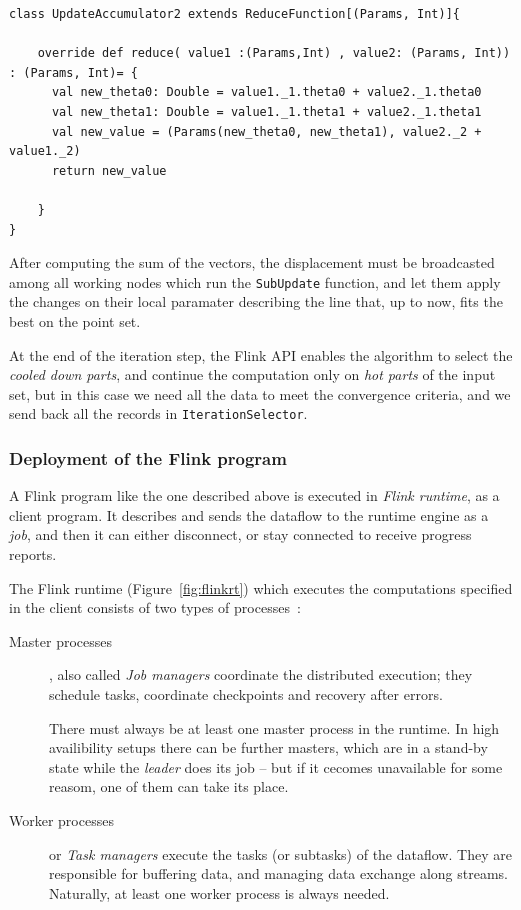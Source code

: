 {\small
\begin{verbatim}
class UpdateAccumulator2 extends ReduceFunction[(Params, Int)]{
   
    override def reduce( value1 :(Params,Int) , value2: (Params, Int)) : (Params, Int)= {
      val new_theta0: Double = value1._1.theta0 + value2._1.theta0
      val new_theta1: Double = value1._1.theta1 + value2._1.theta1
      val new_value = (Params(new_theta0, new_theta1), value2._2 + value1._2)
      return new_value

    }
}
\end{verbatim}
}

After computing the sum of the vectors, the displacement must be broadcasted among all working nodes which run the \verb:SubUpdate: function, and let them apply the changes on their local paramater describing the line that, up to now, fits the best on the point set.

At the end of the iteration step, the Flink API enables the algorithm to select the \textit{cooled down parts}, and continue the computation only on \textit{hot parts} of the input set, but in this case we need all the data to meet the convergence criteria, and we send back all the records in 
\verb|IterationSelector|. 

\subsubsection{Deployment of the Flink program}   
A Flink program like the one described above is executed in \textit{Flink runtime}, as a client program. It describes and sends the dataflow to the runtime engine as a \textit{job}, and then it can either disconnect, or stay connected to receive progress reports.

The Flink runtime (Figure~\ref{fig:flinkrt}) which executes the computations specified in the client consists of two types of processes~\cite{flink_concepts}:

\begin{description}
\item[Master processes], also called \textit{Job managers} coordinate the distributed execution; they schedule tasks, coordinate checkpoints and recovery after errors.

There must always be at least one master process in the runtime. In high availibility setups there can be further masters, which are in a stand-by state while the \textit{leader} does its job -- but if it cecomes unavailable for some reasom, one of them can take its place.

\item[Worker processes] or \textit{Task managers} execute the tasks (or subtasks) of the dataflow. They are responsible for buffering data, and managing data exchange along streams. Naturally, at least one worker process is always needed.
\end{description}

